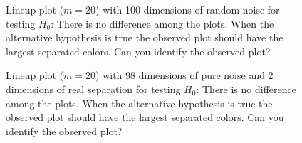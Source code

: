 \documentclass[12]{article}
\begin{document}
\begin{figure}[hbtp]
   \centering
       \caption{Lineup plot ($m=20$) with 100 dimensions of random noise for testing $H_0$: There is no difference among the plots. When the alternative hypothesis is true the observed plot should have the largest separated colors. Can you identify the observed plot?}
       \label{fig:test_category}
\end{figure}


\begin{figure}[hbtp]
   \centering
       \caption{Lineup plot ($m=20$) with 98 dimensions of pure noise and 2 dimensions of real separation for testing $H_0$: There is no difference among the plots. When the alternative hypothesis is true the observed plot should have the largest separated colors. Can you identify the observed plot?}
       \label{not_noise}
\end{figure}
\end{document}

